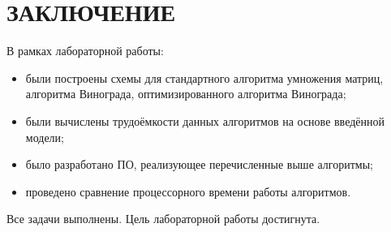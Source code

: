 \chapter*{ЗАКЛЮЧЕНИЕ}

В рамках лабораторной работы:

\begin{itemize}[label=--]
\item были построены схемы для стандартного алгоритма умножения матриц, алгоритма Винограда, оптимизированного алгоритма Винограда;
\item были вычислены трудоёмкости данных алгоритмов на основе введённой модели;
\item было разработано ПО, реализующее перечисленные выше алгоритмы;
\item проведено сравнение процессорного времени работы алгоритмов.
\end{itemize}

Все задачи выполнены. Цель лабораторной работы достигнута.